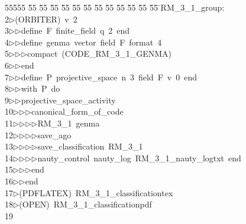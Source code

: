 %
%
\begin{tabbing}
55555 \= 55 \= 55 \= 55 \= 55 \= 55 \= 55 \= 55 \= 55 \= 55 \= 55 \= 55 \= 55 \= \>RM\_3\_1\_group:\\[0pt]
2\>$\triangleright$\>(ORBITER)\ v\ 2\ \\[0pt]
3\>$\triangleright$\>$\triangleright$\>define\ F\ finite\_field\ q\ 2\ end\ \\[0pt]
4\>$\triangleright$\>$\triangleright$\>define\ genma\ vector\ field\ F\ format\ 4\ \\[0pt]
5\>$\triangleright$\>$\triangleright$\>$\triangleright$\>compact\ (CODE\_RM\_3\_1\_GENMA)\ \\[0pt]
6\>$\triangleright$\>$\triangleright$\>end\ \\[0pt]
7\>$\triangleright$\>$\triangleright$\>define\ P\ projective\_space\ n\ 3\ field\ F\ v\ 0\ end\ \\[0pt]
8\>$\triangleright$\>$\triangleright$\>with\ P\ do\ \\[0pt]
9\>$\triangleright$\>$\triangleright$\>projective\_space\_activity\ \\[0pt]
10\>$\triangleright$\>$\triangleright$\>$\triangleright$\>canonical\_form\_of\_code\ \\[0pt]
11\>$\triangleright$\>$\triangleright$\>$\triangleright$\>$\triangleright$\>RM\_3\_1\ genma\ \\[0pt]
12\>$\triangleright$\>$\triangleright$\>$\triangleright$\>$\triangleright$\>save\_ago\ \\[0pt]
13\>$\triangleright$\>$\triangleright$\>$\triangleright$\>$\triangleright$\>save\_classification\ RM\_3\_1\ \\[0pt]
14\>$\triangleright$\>$\triangleright$\>$\triangleright$\>$\triangleright$\>nauty\_control\ nauty\_log\ RM\_3\_1\_nauty\_logtxt\ end\ \\[0pt]
15\>$\triangleright$\>$\triangleright$\>$\triangleright$\>end\ \\[0pt]
16\>$\triangleright$\>$\triangleright$\>end\\[0pt]
17\>$\triangleright$\>(PDFLATEX)\ RM\_3\_1\_classificationtex\\[0pt]
18\>$\triangleright$\>(OPEN)\ RM\_3\_1\_classificationpdf\\[0pt]
19\>\end{tabbing}
